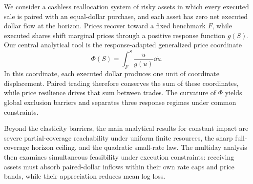 \documentclass[review,hidelinks,onefignum,onetabnum]{siamonline250211}
\begin{document}
We consider a cashless reallocation system of risky assets in which every executed sale is paired with an equal-dollar purchase, and each asset has zero net executed dollar flow at the horizon. Prices recover toward a fixed benchmark $F$, while executed shares shift marginal prices through a positive response function $g(S)$. Our central analytical tool is the response-adapted generalized price coordinate
\begin{equation}\label{eq:phi-intro}
\Phi(S)=\int_F^S\frac{u}{g(u)}\dd u.
\end{equation}
In this coordinate, each executed dollar produces one unit of coordinate displacement. Paired trading therefore conserves the sum of these coordinates, while price resilience drives that sum between trades. The curvature of $\Phi$ yields global exclusion barriers and separates three response regimes under common constraints.

Beyond the elasticity barriers, the main analytical results for constant impact are severe partial-coverage reachability under uniform finite resources, the sharp full-coverage horizon ceiling, and the quadratic small-rate law. The multiday analysis then examines simultaneous feasibility under execution constraints: receiving assets must absorb paired-dollar inflows within their own rate caps and price bands, while their appreciation reduces mean log loss.
\end{document}
